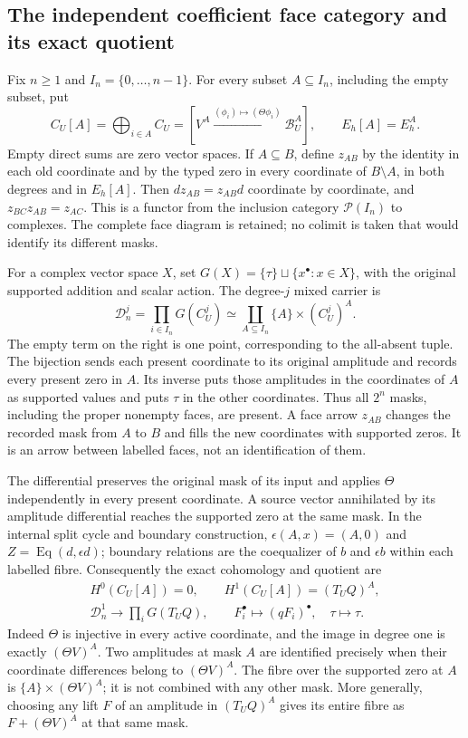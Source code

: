 \subsection{The independent coefficient face category and its exact quotient}

Fix $n\geq1$ and $I_n=\{0,\ldots,n-1\}$.  For every subset
$A\subseteq I_n$, including the empty subset, put
\[
C_U[A]=\bigoplus_{i\in A}C_U
 =[V^A\xrightarrow{(\phi_i)\mapsto(\Theta\phi_i)}\mathscr B_U^A],
\qquad E_h[A]=E_h^A.
\tag{MCF6}
\]
Empty direct sums are zero vector spaces.  If $A\subseteq B$, define
$z_{AB}$ by the identity in each old coordinate and by the typed zero in
every coordinate of $B\setminus A$, in both degrees and in $E_h[A]$.
Then $d z_{AB}=z_{AB}d$ coordinate by coordinate, and
$z_{BC}z_{AB}=z_{AC}$.  This is a functor from the inclusion category
$\mathcal P(I_n)$ to complexes.  The complete face diagram is retained;
no colimit is taken that would identify its different masks.

For a complex vector space $X$, set
$G(X)=\{\tau\}\sqcup\{x^\bullet:x\in X\}$, with the original supported
addition and scalar action.  The degree-$j$ mixed carrier is
\[
\mathscr D_n^j=\prod_{i\in I_n}G(C_U^j)
\simeq\coprod_{A\subseteq I_n}\{A\}\times(C_U^j)^A.
\tag{MCF7}
\]
The empty term on the right is one point, corresponding to the all-absent
tuple.  The bijection sends each present coordinate to its original
amplitude and records every present zero in $A$.  Its inverse puts those
amplitudes in the coordinates of $A$ as supported values and puts $\tau$
in the other coordinates.  Thus all $2^n$ masks, including the proper
nonempty faces, are present.  A face arrow $z_{AB}$ changes the recorded
mask from $A$ to $B$ and fills the new coordinates with supported zeros.
It is an arrow between labelled faces, not an identification of them.

The differential preserves the original mask of its input and applies
$\Theta$ independently in every present coordinate.  A source vector
annihilated by its amplitude differential reaches the supported zero at
the same mask.  In the internal split cycle and boundary construction,
$\epsilon(A,x)=(A,0)$ and
$Z=\operatorname{Eq}(d,\epsilon d)$; boundary relations are the
coequalizer of $b$ and $\epsilon b$ within each labelled fibre.
Consequently the exact cohomology and quotient are
\[
\begin{gathered}
H^0(C_U[A])=0,\qquad H^1(C_U[A])=(T_UQ)^A,\\
\mathscr D_n^1\longrightarrow\prod_iG(T_UQ),\qquad
F_i^\bullet\longmapsto(qF_i)^\bullet,\quad\tau\longmapsto\tau.
\end{gathered}
\tag{MCF8}
\]
Indeed $\Theta$ is injective in every active coordinate, and the image
in degree one is exactly $(\Theta V)^A$.  Two amplitudes at mask $A$
are identified precisely when their coordinate differences belong to
$(\Theta V)^A$.  The fibre over the supported zero at $A$ is
$\{A\}\times(\Theta V)^A$; it is not combined with any other mask.
More generally, choosing any lift $F$ of an amplitude in $(T_UQ)^A$
gives its entire fibre as $F+(\Theta V)^A$ at that same mask.

